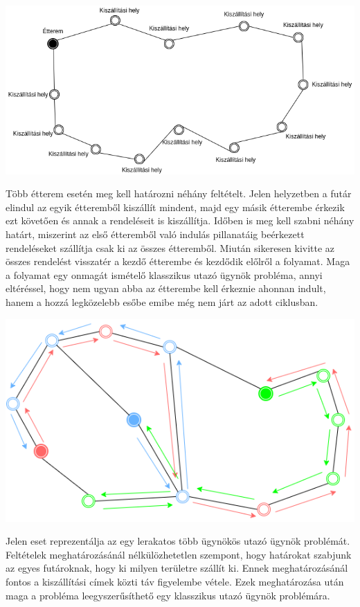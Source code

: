 \includegraphics[scale=0.5]{images/Simpletsp.png}


Több étterem esetén meg kell határozni néhány feltételt. Jelen helyzetben a futár elindul az egyik étteremből kiszállít mindent, majd egy másik étterembe érkezik ezt követően és annak a rendeléseit is kiszállítja. Időben is meg kell szabni néhány határt, miszerint az első étteremből való indulás pillanatáig beérkezett rendeléseket szállítja csak ki az összes étteremből. Miután sikeresen kivitte az összes rendelést visszatér a kezdő étterembe és kezdődik előlről a folyamat. Maga a folyamat egy onmagát ismételő klasszikus utazó ügynök probléma, annyi eltéréssel, hogy nem ugyan abba az étterembe kell érkeznie ahonnan indult, hanem a hozzá legközelebb esőbe emibe még nem járt az adott ciklusban.

\includegraphics[scale=0.6]{images/Circulartsp.png}


Jelen eset reprezentálja az egy lerakatos több ügynökös utazó ügynök problémát. Feltételek meghatározásánál nélkülözhetetlen szempont, hogy határokat szabjunk az egyes futároknak, hogy ki milyen területre szállít ki. Ennek meghatározásánál fontos a kiszállítási címek közti táv figyelembe vétele. Ezek meghatározása után maga a probléma leegyszerűsíthető egy klasszikus utazó ügynök problémára.

